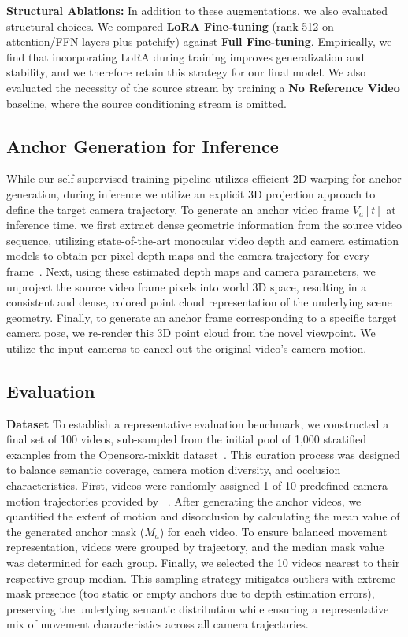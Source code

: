 \noindent \textbf{Structural Ablations:} In addition to these augmentations, we also evaluated structural choices. We compared \textbf{LoRA Fine-tuning} (rank-512 on attention/FFN layers plus patchify) against \textbf{Full Fine-tuning}. Empirically, we find that incorporating LoRA during training improves generalization and stability, and we therefore retain this strategy for our final model. We also evaluated the necessity of the source stream by training a \textbf{No Reference Video} baseline, where the source conditioning stream is omitted.


\subsection{Anchor Generation for Inference}
\label{sec:inference_anchor_gen}

While our self-supervised training pipeline utilizes efficient 2D warping for anchor generation, during inference we utilize an explicit 3D projection approach to define the target camera trajectory. To generate an anchor video frame $V_a[t]$ at inference time, we first extract dense geometric information from the source video sequence, utilizing state-of-the-art monocular video depth and camera estimation models to obtain per-pixel depth maps and the camera trajectory for every frame~\cite{huang2025vipe, xu2025geometrycrafter, 4d_recon_hu2025depthcrafter}. Next, using these estimated depth maps and camera parameters, we unproject the source video frame pixels into world 3D space, resulting in a consistent and dense, colored point cloud representation of the underlying scene geometry. Finally, to generate an anchor frame corresponding to a specific target camera pose, we re-render this 3D point cloud from the novel viewpoint. We utilize the input cameras to cancel out the original video's camera motion.


\subsection{Evaluation}

\textbf{Dataset}
To establish a representative evaluation benchmark, we constructed a final set of 100 videos, sub-sampled from the initial pool of 1,000 stratified examples from the Opensora-mixkit dataset~\cite{lin2024open}. This curation process was designed to balance semantic coverage, camera motion diversity, and occlusion characteristics. First, videos were randomly assigned 1 of 10 predefined camera motion trajectories provided by \recammaster{}~\cite{bai2025recammaster}. After generating the anchor videos, we quantified the extent of motion and disocclusion by calculating the mean value of the generated anchor mask ($M_a$) for each video. To ensure balanced movement representation, videos were grouped by trajectory, and the median mask value was determined for each group. Finally, we selected the 10 videos nearest to their respective group median. This sampling strategy mitigates outliers with extreme mask presence (too static or empty anchors due to depth estimation errors), preserving the underlying semantic distribution while ensuring a representative mix of movement characteristics across all camera trajectories.



